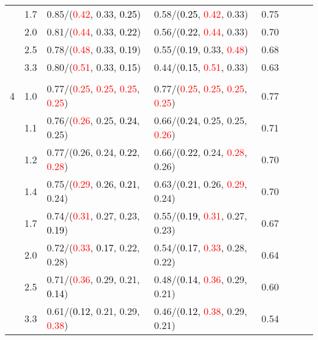 \documentclass[10pt,a4paper]{report}
\begin{document}
\begin{table}[!htbp]
\begin{center}
{\begin{tabular}{ccllcccc}
			&1.7&0.85/(\textcolor{red}{0.42}, 0.33, \textcolor{black}{0.25})&0.58/(\textcolor{black}{0.25}, \textcolor{red}{0.42}, 0.33)&0.75\\
			&2.0&0.81/(\textcolor{red}{0.44}, 0.33, \textcolor{black}{0.22})&0.56/(\textcolor{black}{0.22}, \textcolor{red}{0.44}, 0.33)&0.70\\
			&2.5&0.78/(\textcolor{red}{0.48}, 0.33, \textcolor{black}{0.19})&0.55/(\textcolor{black}{0.19}, 0.33, \textcolor{red}{0.48})&0.68\\
			&3.3&0.80/(\textcolor{red}{0.51}, 0.33, \textcolor{black}{0.15})&0.44/(\textcolor{black}{0.15}, \textcolor{red}{0.51}, 0.33)&0.63\\
			&&&&\\
			4			&1.0&0.77/(\textcolor{red}{0.25}, \textcolor{red}{0.25}, \textcolor{red}{0.25}, \textcolor{red}{0.25})&0.77/(\textcolor{red}{0.25}, \textcolor{red}{0.25}, \textcolor{red}{0.25}, \textcolor{red}{0.25})&0.77\\
			&1.1&0.76/(\textcolor{red}{0.26}, 0.25, \textcolor{black}{0.24}, 0.25)&0.66/(\textcolor{black}{0.24}, 0.25, 0.25, \textcolor{red}{0.26})&0.71\\
			&1.2&0.77/(0.26, 0.24, \textcolor{black}{0.22}, \textcolor{red}{0.28})&0.66/(\textcolor{black}{0.22}, 0.24, \textcolor{red}{0.28}, 0.26)&0.70\\
			&1.4&0.75/(\textcolor{red}{0.29}, 0.26, \textcolor{black}{0.21}, 0.24)&0.63/(\textcolor{black}{0.21}, 0.26, \textcolor{red}{0.29}, 0.24)&0.70\\
			&1.7&0.74/(\textcolor{red}{0.31}, 0.27, 0.23, \textcolor{black}{0.19})&0.55/(\textcolor{black}{0.19}, \textcolor{red}{0.31}, 0.27, 0.23)&0.67\\
			&2.0&0.72/(\textcolor{red}{0.33}, \textcolor{black}{0.17}, 0.22, 0.28)&0.54/(\textcolor{black}{0.17}, \textcolor{red}{0.33}, 0.28, 0.22)&0.64\\
			&2.5&0.71/(\textcolor{red}{0.36}, 0.29, 0.21, \textcolor{black}{0.14})&0.48/(\textcolor{black}{0.14}, \textcolor{red}{0.36}, 0.29, 0.21)&0.60\\
			&3.3&0.61/(\textcolor{black}{0.12}, 0.21, 0.29, \textcolor{red}{0.38})&0.46/(\textcolor{black}{0.12}, \textcolor{red}{0.38}, 0.29, 0.21)&0.54\\
			\bottomrule
		\end{tabular}}
	\end{center}
\end{table}
\end{document}
